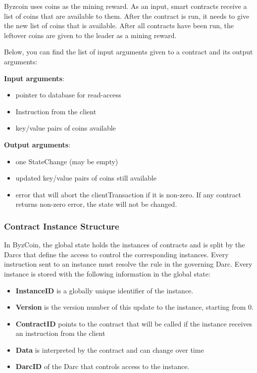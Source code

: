 Byzcoin uses coins as the mining reward. As an input, smart contracts receive a list of coins that are available to them. After the contract is run, it needs to give the new list of coins that is available. After all contracts have been run, the leftover coins are given to the leader as a mining reward.

Below, you can find the list of input arguments given to a contract and its output arguments:

\textbf{Input arguments}: 
\begin{itemize}
    \item pointer to database for read-access
    \item Instruction from the client
    \item key/value pairs of coins available
\end{itemize}

\textbf{Output arguments}: 
\begin{itemize}
    \item one StateChange (may be empty)
    \item updated key/value pairs of coins still available
    \item error that will abort the clientTransaction if it is non-zero. If any contract returns non-zero error, the state will not be changed.
\end{itemize}

\subsubsection{Contract Instance Structure}
In ByzCoin, the global state holds the instances of contracts and is split by the Darcs that define the access to control the corresponding instances. Every instruction sent to an instance must resolve the rule in the governing Darc. Every instance is stored with the following information in the global state:

\begin{itemize}
    \item \textbf{InstanceID} is a globally unique identifier of the instance.
    \item \textbf{Version} is the version number of this update to the instance, starting from 0.
    \item \textbf{ContractID} points to the contract that will be called if the instance receives an instruction from the client
    \item \textbf{Data} is interpreted by the contract and can change over time \item \textbf{DarcID} of the Darc that controls access to the instance.
\end{itemize}

